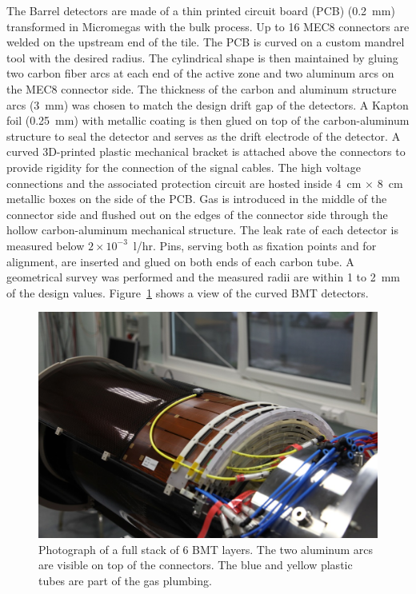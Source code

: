 The Barrel detectors are made of a thin printed circuit board (PCB) (0.2~mm) transformed in Micromegas with the bulk
process. Up to 16 MEC8 connectors are welded on the upstream end of the tile. The PCB is curved on a custom mandrel tool
with the desired radius. The cylindrical shape is then maintained by gluing two carbon fiber arcs at each end of the active
zone and two aluminum arcs on the MEC8 connector side. The thickness of the carbon and aluminum structure arcs (3~mm)
was chosen to match the design drift gap of the detectors. A Kapton foil (0.25~mm) with metallic coating is then glued on top
of the carbon-aluminum structure to seal the detector and serves as the drift electrode of the detector. A curved 3D-printed
plastic mechanical bracket is attached above the connectors to provide rigidity for the connection of the signal cables. The high
voltage connections and the associated protection circuit are hosted inside 4~cm $\times$ 8~cm metallic boxes on the side of
the PCB.  Gas is introduced in the middle of the connector side and flushed out on the edges of the connector side through the
hollow carbon-aluminum mechanical structure. The leak rate of each detector is measured below \(2\times10^{-3}\)~l/hr. Pins,
serving both as fixation points and for alignment, are inserted and glued on both ends of each carbon tube. A geometrical survey
was performed and the measured radii are within 1 to 2~mm of the design values. Figure~\ref{fig:mm-fig4} shows a view of the
curved BMT detectors.

\begin{figure}[htb]
 \includegraphics[width=1.0\columnwidth,keepaspectratio]{images/fig5}
 \caption{Photograph of a full stack of 6 BMT layers. The two aluminum arcs are visible on top of the connectors. The blue and
   yellow plastic tubes are part of the gas plumbing.}
 \label{fig:mm-fig4}
\end{figure}

